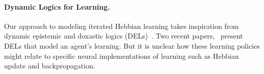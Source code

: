 \documentclass[letterpaper]{article}
\theoremstyle{definition}
\newcommand{\semantics}[1]{[\![\mbox{\em $ #1 $\/}]\!]}
\begin{document}


% 
% 

\paragraph*{Dynamic Logics for Learning.}
Our approach to modeling iterated Hebbian learning takes inspiration from dynamic epistemic and doxastic logics (DELs)~\cite{DELBook,van2011logicaldynamics}.  Two recent papers,~\cite{baltag2019right, baltag2019dynamic} present DELs that model an agent's learning.  But it is unclear how these learning policies might relate to specific neural implementations of learning such as Hebbian update and backpropagation.  
\end{document}
